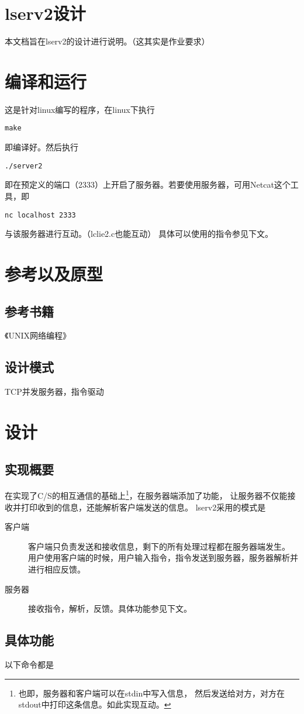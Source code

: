 \documentclass[a4paper,12pt]{article}
\begin{document}
\begin{CJK}{UTF8}{gbsn}

\section*{lserv2设计}
	本文档旨在lserv2的设计进行说明。（这其实是作业要求）

\section{编译和运行}
	这是针对linux编写的程序，在linux下执行
	\begin{verbatim}
make
	\end{verbatim}
	即编译好。然后执行
	\begin{verbatim}
./server2
	\end{verbatim}
	即在预定义的端口（2333）上开启了服务器。若要使用服务器，可用Netcat这个工具，即
	\begin{verbatim}
nc localhost 2333
	\end{verbatim}
	与该服务器进行互动。（lclie2.c也能互动）\newline
	具体可以使用的指令参见下文。

\section{参考以及原型}
	\subsection{参考书籍}
		《UNIX网络编程》
	\subsection{设计模式}
		TCP并发服务器，指令驱动

\section{设计}
	\subsection{实现概要}
		在实现了C/S的相互通信的基础上\footnote{也即，服务器和客户端可以在stdin中写入信息，
		然后发送给对方，对方在stdout中打印这条信息。如此实现互动。}，在服务器端添加了功能，
		让服务器不仅能接收并打印收到的信息，还能解析客户端发送的信息。\newline
		lserv2采用的模式是
		\begin{description}
		\item[客户端] 客户端只负责发送和接收信息，剩下的所有处理过程都在服务器端发生。
		用户使用客户端的时候，用户输入指令，指令发送到服务器，服务器解析并进行相应反馈。
		\item[服务器] 接收指令，解析，反馈。具体功能参见下文。
		\end{description}
	\subsection{具体功能}
		以下命令都是




\end{CJK}
\end{document}
